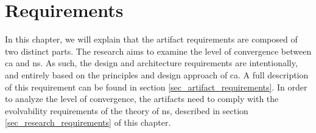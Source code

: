 \chapter{Requirements} \label{chap_requirements} 

In this chapter, we will explain that the artifact requirements are composed of two
distinct parts. The research aims to examine the level of convergence between \gls{ca} and
\gls{ns}. As such, the design and architecture requirements are intentionally, and entirely 
based on the principles and design approach of \gls{ca}. A full description of this requirement
can be found in section \ref{sec_artifact_requirements}. In order to analyze the level of
convergence, the artifacts need to comply with the evolvability requirements of the theory
of \gls{ns}, described in section \ref{sec_research_requirements} of this chapter.


